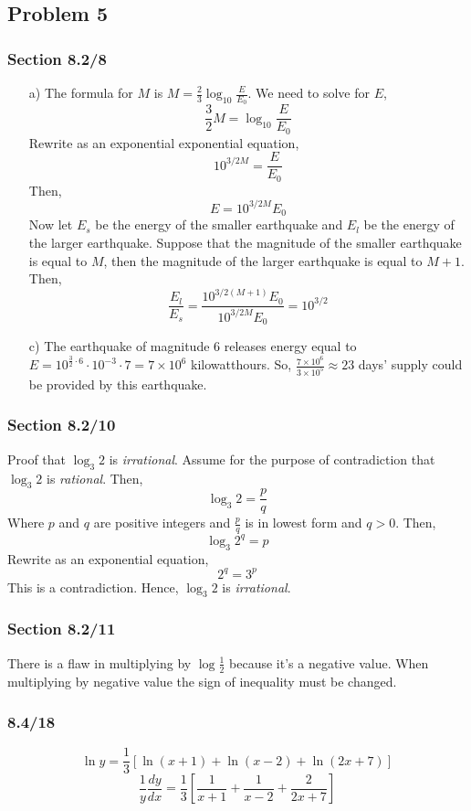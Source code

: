 \documentclass{article}
\begin{document}
\subsection{Problem 5}
\subsubsection{Section 8.2/8}
\begin{itemize}
    \item[a)] The formula for $M$ is $M = \frac{2}{3}\log_{10}{\frac{E}{E_0}}$. We need to solve for $E$,
    \[ \frac{3}{2}M = \log_{10}{\frac{E}{E_0}} \]
    Rewrite as an exponential exponential equation,
    \[ 10^{3/2M} = \frac{E}{E_0} \]
    Then, 
    \[ E = 10^{3/2M}E_0 \]
    Now let $E_s$ be the energy of the smaller earthquake and $E_l$ be the energy of the larger earthquake. Suppose that the magnitude of the smaller earthquake is equal to $M$, then the magnitude of the larger earthquake is equal to $M+1$. Then, 
    \[ \frac{E_l}{E_s} = \frac{10^{3/2(M+1)}E_0}{10^{3/2M}E_0} = 10^{3/2} \]

    \item[c)] The earthquake of magnitude 6 releases energy equal to $E = 10^{\frac{3}{2} \cdot 6} \cdot 10^{-3} \cdot 7 = 7 \times 10^6$ kilowatthours. So, $\frac{7 \times 10^6}{3 \times 10^5} \approx 23$ days' supply could be provided by this earthquake.  
\end{itemize}

\subsubsection{Section 8.2/10}
Proof that $\log_{3}{2}$ is \textit{irrational}. Assume for the purpose of contradiction that $\log_{3}{2}$ is \textit{rational}. Then,
\[ \log_{3}{2} = \frac{p}{q} \]
Where $p$ and $q$ are positive integers and $\frac{p}{q}$ is in lowest form and $q > 0$. Then,
\[ \log_{3}{2^q} = p \]
Rewrite as an exponential equation,
\[ 2^q = 3^p \]
This is a contradiction. Hence, $\log_{3}{2}$ is \textit{irrational}.

\subsubsection{Section 8.2/11}
There is a flaw in multiplying by $\log\frac{1}{2}$ because it's a negative value. When multiplying by negative value the sign of inequality must be changed.

\subsubsection{8.4/18}
\[ \ln{y} = \frac{1}{3} \left[ \ln{(x+1)} + \ln{(x-2)} + \ln{(2x+7)} \right] \]
\[ \frac{1}{y} \frac{dy}{dx} = \frac{1}{3} \left[ \frac{1}{x+1} + \frac{1}{x-2} + \frac{2}{2x+7} \right] \]
\end{document}
